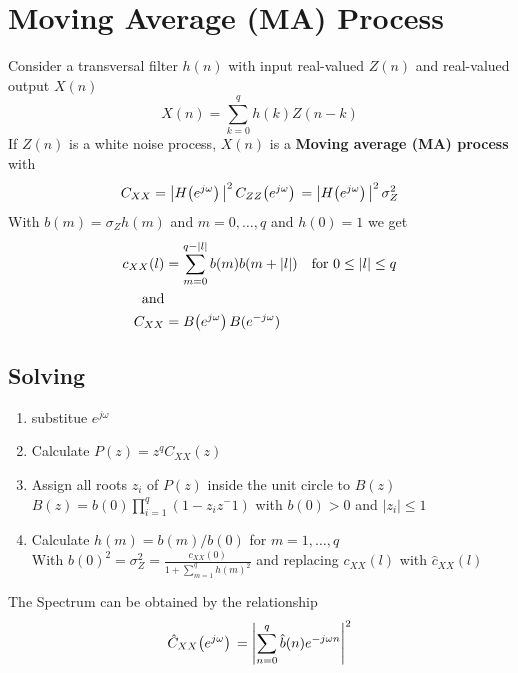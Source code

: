 \documentclass[accentcolor=tud4c,9.5pt,nochapname,bigchapter,paper=a5report]{tudreport}
\begin{document}
\section{Moving Average (MA) Process}
Consider a transversal filter $h(n)$ with input real-valued $Z(n)$ and real-valued output $X(n)$
\begin{equation}
X(n)=\sum\limits_{k=0}^q h(k)Z(n-k)
\end{equation} 
If $Z(n)$ is a white noise process, $X(n)$ is a {\bf Moving average (MA) process} with
\begin{equation}
C_{XX}=\left|H{\left(e^{j\omega}\right)}\,\right|^2C_{ZZ}{\left(e^{j\omega}\right)}\, =\left|H{\left(e^{j\omega}\right)}\,\right|^2\sigma_Z^2 
\end{equation}
With $b(m)=\sigma_Z h(m)$ and $m=0,\ldots,q$ and $h(0)=1$ we get
\begin{align}
c_{XX}(l)&=\sum\limits_{m=0}^{q-|l|} b(m)b(m+|l|) \quad \text{for } 0\leq |l| \leq q\\
\text{and}\\
C_{XX} &= B{\left(e^{j\omega}\right)}\, B(e^{-j\omega})
\end{align}
\subsection{Solving} \label{solv}
\begin{enumerate}
  \item substitue $e^{j\omega}$
  \item Calculate $P(z)=z^qC_{XX}(z)$
  \item Assign all roots $z_i$ of $P(z)$ inside the unit circle to $B(z)$ \\
  		$B(z)=b(0)\prod_{i=1}^q(1-z_iz^-1)$ with $b(0)>0$ and $|z_i|\leq 1$
  \item Calculate $h(m)=b(m)/b(0)$ for $m=1,\ldots,q$\\ 
		With $b(0)^2=\sigma_Z^2=\frac{c_{XX}(0)}{1+\sum_{m=1}^q h(m)^2}$ and replacing $c_{XX}(l)$ with $\hat{c}_{XX}(l)$ 
\end{enumerate}
The Spectrum can be obtained by the relationship
\begin{equation}
\hat{C}_{XX}{\left(e^{j\omega}\right)}\, = \left|\sum\limits_{n=0}^q \hat{b}(n)e^{-j\omega n} \right|^2
\end{equation}
\end{document}
